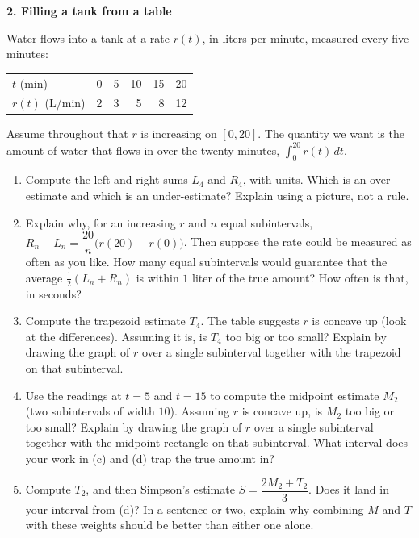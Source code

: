 \documentclass[11pt]{article}
\newcommand{\prob}[1]{\medskip\noindent\textbf{\large #1}\par\smallskip}
\begin{document}
\newpage
\prob{2. Filling a tank from a table}
Water flows into a tank at a rate $r(t)$, in liters per minute, measured every five minutes:
\smallskip
\begin{center}
\begin{tabular}{@{}lrrrrr@{}}
\toprule
$t$ (min) & 0 & 5 & 10 & 15 & 20\\
$r(t)$ (L/min) & 2 & 3 & 5 & 8 & 12\\
\bottomrule
\end{tabular}
\end{center}
\smallskip
Assume throughout that $r$ is increasing on $[0,20]$. The quantity we want is the amount of
water that flows in over the twenty minutes, $\displaystyle\int_0^{20} r(t)\,dt$.
\begin{enumerate}
\item Compute the left and right sums $L_4$ and $R_4$, with units. Which is an over-estimate and which is an under-estimate? Explain using a picture, not a rule.

\item Explain why, for an increasing $r$ and $n$ equal subintervals, $R_n-L_n=\dfrac{20}{n}\big(r(20)-r(0)\big)$. Then suppose the rate could be measured as often as you like. How many equal subintervals would guarantee that the average $\tfrac12(L_n+R_n)$ is within $1$ liter of the true amount? How often is that, in seconds?

\item Compute the trapezoid estimate $T_4$. The table suggests $r$ is concave up (look at the differences). Assuming it is, is $T_4$ too big or too small? Explain by drawing the graph of $r$ over a single subinterval together with the trapezoid on that subinterval.

\item Use the readings at $t=5$ and $t=15$ to compute the midpoint estimate $M_2$ (two subintervals of width $10$). Assuming $r$ is concave up, is $M_2$ too big or too small? Explain by drawing the graph of $r$ over a single subinterval together with the midpoint rectangle on that subinterval. What interval does your work in (c) and (d) trap the true amount in?

\item Compute $T_2$, and then Simpson's estimate $S=\dfrac{2M_2+T_2}{3}$. Does it land in your interval from (d)? In a sentence or two, explain why combining $M$ and $T$ with these weights should be better than either one alone.

\end{enumerate}
\end{document}
